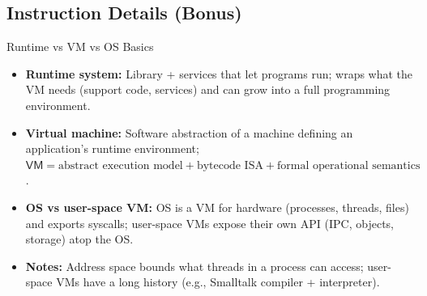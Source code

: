 \documentclass[handout,aspectratio=169,xcolor=dvipsnames,10pt]{beamer}
\begin{document}

\subsection*{Instruction Details (Bonus)}


\begin{frame}{Runtime vs VM vs OS Basics}

\vfill

\begin{itemize}
  \item \textbf{Runtime system:} Library + services that let programs run; wraps what the VM needs (support code, services) and can grow into a full programming environment.
  \item \textbf{Virtual machine:} Software abstraction of a machine defining an application's runtime environment; \(\mathsf{VM} = \text{abstract execution model} + \text{bytecode ISA} + \text{formal operational semantics}\).
  \item \textbf{OS vs user-space VM:} OS is a VM for hardware (processes, threads, files) and exports syscalls; user-space VMs expose their own API (IPC, objects, storage) atop the OS.
  \item \textbf{Notes:} Address space bounds what threads in a process can access; user-space VMs have a long history (e.g., Smalltalk compiler + interpreter).
\end{itemize}

\vfill

\end{frame}

\end{document}
